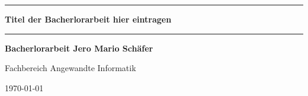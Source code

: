 
\newpage
\thispagestyle{empty}
\newcommand{\Rule}{\rule{\textwidth}{1mm}}

\begin{center}

\Rule\vspace{5mm}
\sffamily\bfseries\Huge
Titel der Bacherlorarbeit hier eintragen
\vspace{1mm}\Rule
\vfill
\sffamily\bfseries\LARGE Bacherlorarbeit
\vfill
\sffamily\bfseries\Large Jero Mario Schäfer\par
Fachbereich Angewandte Informatik\par
\vfill

\raisebox{7mm}{Georg-August-Universität}
\raisebox{7mm}{Göttingen}\par
\vfill
\today
\end{center}
\newpage

